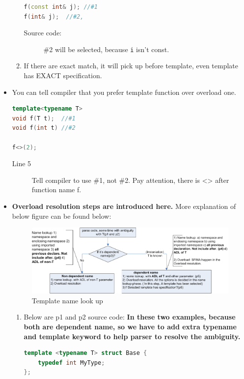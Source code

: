 \documentclass[a4paper,11pt,twoside]{book}
\begin{document}
\begin{itemize}
\begin{enumerate}
\begin{lstlisting}[frame=single, language=c++]
f(const int& j); //#1
f(int& j);  //#2, 
\end{lstlisting}
\begin{description}
	\item[Source code:] \#2 will be selected, because \texttt{i} isn't const.
\end{description}
		\item If there are exact match, it will pick up before template, even template has EXACT specification.
\end{enumerate}

	\item You can tell compiler that you prefer template function over overload one.

\begin{lstlisting}[frame=single, language=c++]
template<typename T>
void f(T t);  //#1
void f(int t) //#2

f<>(2); 
\end{lstlisting}
\begin{description}
	\item[Line 5] Tell compiler to use \#1, not \#2. Pay attention, there is <> after function name f.
\end{description}

    \item \textbf{Overload resolution steps are introduced here.} More explanation of below figure can be found below:

\begin{figure}[ht]
	\centering 
	\includegraphics[width=0.8\linewidth]{pics/template.png}
	\caption{Template name look up}
	\label{fig:command}
\end{figure}

\begin{enumerate}

\item Below are p1 and p2 source code: \textbf{In these two examples, because both are dependent name, so we have to add extra typename and template keyword to help parser to resolve the ambiguity.}

\begin{lstlisting}[frame=single, language=c++]
template <typename T> struct Base {
	typedef int MyType;
};


\end{lstlisting}
\end{enumerate}
\end{itemize}
\end{document}

